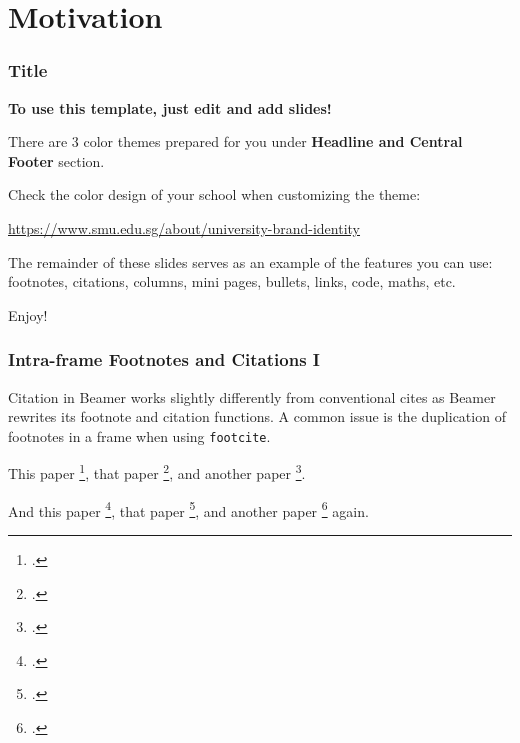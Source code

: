 \section{Motivation} %

\begin{frame}
    \frametitle{Title}
    \begin{center}
        \textbf{To use this template, just edit and add slides!} \newline
    \end{center}

    There are 3 color themes prepared for you under \textbf{Headline and Central Footer} section. \newline

    Check the color design of your school when customizing the theme: \newline

    \begin{center}
        \href{https://www.smu.edu.sg/about/university-brand-identity}{https://www.smu.edu.sg/about/university-brand-identity} \newline
    \end{center}

    The remainder of these slides serves as an example of the features you can use: footnotes, citations, columns, mini pages, bullets, links, code, maths, etc.

    \begin{center}
        {\Huge\calligra Enjoy!}
    \end{center}
\end{frame}

\begin{frame}
    \frametitle{Intra-frame Footnotes and Citations I}
    
    Citation in Beamer works slightly differently from conventional cites as Beamer rewrites its footnote and citation functions. 
    A common issue is the duplication of footnotes in a frame when using \texttt{footcite}. \newline

    This paper \footcite{Harshman1970}, that paper \footcite{Hitchcock1927}, and another paper \footcite{Carroll1970}. \newline

    And this paper \footcite{Harshman1970}, that paper \footcite{Hitchcock1927}, and another paper \footcite{Carroll1970} again. 
\end{frame}

